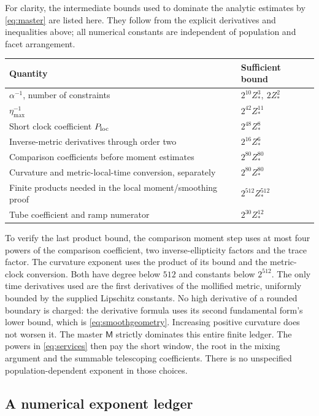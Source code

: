 \documentclass[11pt]{article}
\numberwithin{equation}{section}
\theoremstyle{definition}
\theoremstyle{remark}\newtheorem{remark}[theorem]{Remark}
\begin{document}
For clarity, the intermediate bounds used to dominate the analytic
estimates by \eqref{eq:master} are listed here. They follow from the
explicit derivatives and inequalities above; all numerical constants are
independent of population and facet arrangement.
\begin{center}\small
\begin{tabular}{@{}p{}l@{}}\toprule
Quantity & Sufficient bound\\\midrule
$\alpha^{-1}$, number of constraints & $2^{10}Z_*^3,\ 2Z_*^2$\\
$\eta_{\max}^{-1}$ & $2^{42}Z_*^{11}$\\
Short clock coefficient $P_{\rm loc}$ & $2^{48}Z_*^8$\\
Inverse-metric derivatives through order two & $2^{16}Z_*^6$\\
Comparison coefficients before moment estimates & $2^{80}Z_*^{80}$\\
Curvature and metric-local-time conversion, separately & $2^{80}Z_*^{80}$\\
Finite products needed in the local moment/smoothing proof & $2^{512}Z_*^{512}$\\
Tube coefficient and ramp numerator & $2^{30}Z_*^{12}$\\
\bottomrule\end{tabular}
\end{center}
To verify the last product bound, the comparison moment step uses at most
four powers of the comparison coefficient, two inverse-ellipticity
factors and the trace factor. The curvature exponent uses the product of
its bound and the metric-clock conversion. Both have degree below $512$
and constants below $2^{512}$. The only time derivatives used are the
first derivatives of the mollified metric, uniformly bounded by the
supplied Lipschitz constants. No high derivative of a rounded boundary is
charged: the derivative formula uses its second fundamental form's lower
bound, which is \eqref{eq:smoothgeometry}. Increasing positive curvature
does not worsen it. The master $\mathsf M$ strictly dominates this entire
finite ledger. The powers in \eqref{eq:services} then pay the short window,
the root in the mixing argument and the summable telescoping coefficients.
There is no unspecified population-dependent exponent in those choices.

\subsection{A numerical exponent ledger}
\end{document}
